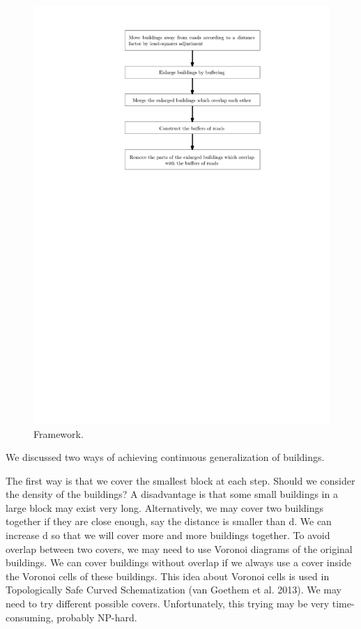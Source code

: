 \documentclass[graybox]{svmult}
\begin{document}
\begin{figure}[tb]
	\centering
	\includegraphics{Framework}
	\caption{Framework.}
	\label{fig:Framework}
\end{figure}



We discussed two ways of achieving continuous generalization of 
buildings. 

The first way is that we cover the smallest block at each step. 
Should we consider the density of the buildings? 
A disadvantage 
is that some small buildings in a large block may exist very 
long.
Alternatively, we may cover two buildings together if they are 
close enough, say the distance is smaller than d. We can 
increase d so that we will cover more and more buildings 
together. To avoid overlap between two covers, we may need to 
use Voronoi diagrams of the original buildings. We can cover 
buildings without overlap if we always use a cover inside the 
Voronoi cells of these buildings. This idea about Voronoi cells 
is used in Topologically Safe Curved Schematization (van Goethem 
et al. 2013). We may need to try different possible covers. 
Unfortunately, this trying may be very time-consuming, probably 
NP-hard.
\end{document}

